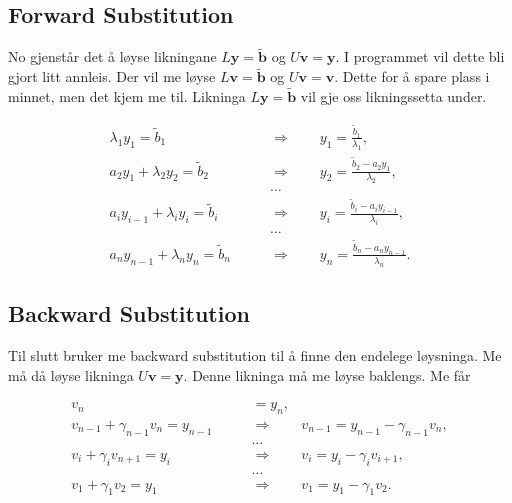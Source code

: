 \documentclass[11pt, a4paper]{article}
\begin{document}
  \subsection{Forward Substitution}
    No gjenstår det å løyse likningane $L\mathbf{y} = \mathbf{\tilde{b}}$ og $U\mathbf{v} =
    \mathbf{y}$. I programmet vil dette bli gjort litt annleis. Der vil me løyse $L\mathbf{v} 
    = \mathbf{\tilde{b}}$ og $U\mathbf{v} = \mathbf{v}$. Dette for å spare plass i minnet, men det 
    kjem me til. Likninga $L\mathbf{y} = \mathbf{\tilde{b}}$ vil gje oss likningssetta under.
    
    \begin{align*}
      \lambda_1y_1 = \tilde{b}_1 \qquad &\Rightarrow \qquad y_1 = \frac{\tilde{b}_1}{\lambda_1}, \\
      a_2y_1 + \lambda_2y_2 = \tilde{b}_2 \qquad &\Rightarrow \qquad y_2 = \frac{\tilde{b}_2 - a_2
      y_1}{\lambda_2}, \\
      &\dots \\
      a_iy_{i-1} + \lambda_iy_i = \tilde{b}_i \qquad &\Rightarrow \qquad y_i = \frac{\tilde{b}_i
      - a_iy_{i-1}}{\lambda_i}, \\
      &\dots \\
      a_ny_{n-1} + \lambda_ny_n = \tilde{b}_n \qquad &\Rightarrow \qquad y_n = \frac{\tilde{b}_n
      - a_ny_{n-1}}{\lambda_n}.
    \end{align*}

  \subsection{Backward Substitution}
    Til slutt bruker me backward substitution til å finne den endelege løysninga. Me må då løyse
    likninga $U\mathbf{v} = \mathbf{y}$. Denne likninga må me løyse baklengs. Me får

    \begin{align*}
      v_n &= y_n, \\
      v_{n-1} + \gamma_{n-1}v_n = y_{n-1} \qquad &\Rightarrow \qquad v_{n-1} = y_{n-1} - 
      \gamma_{n-1}v_n, \\
      &\dots \\
      v_i + \gamma_iv_{n+1} = y_i \qquad &\Rightarrow \qquad v_i = y_i - \gamma_iv_{i+1}, \\
      &\dots \\
      v_1 + \gamma_1v_2 = y_1 \qquad &\Rightarrow \qquad v_1 = y_1 - \gamma_1v_2.
    \end{align*}
\end{document}
